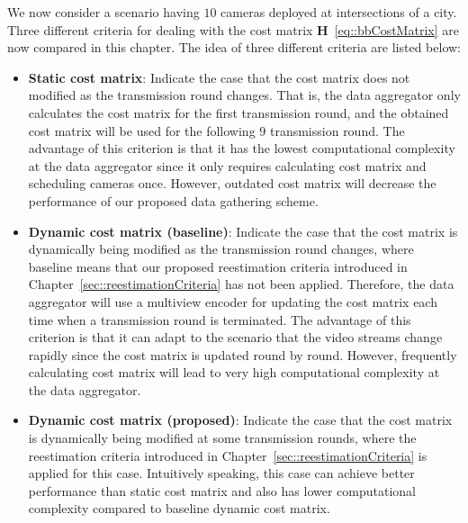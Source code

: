 {We now consider a scenario having $10$ cameras deployed at intersections of a city.
Three different criteria for dealing with the cost matrix $\mathbf{H}$~\eqref{eq::bbCostMatrix} are now compared in this chapter.
The idea of three different criteria are listed below:
\begin{itemize}
\item \textbf{Static cost matrix}: Indicate the case that the cost matrix does not modified as the transmission round changes.
That is, the data aggregator only calculates the cost matrix for the first transmission round, and the obtained cost matrix will be used for the following $9$ transmission round.
The advantage of this criterion is that it has the lowest computational complexity at the data aggregator since it only requires calculating cost matrix and scheduling cameras once.
However, outdated cost matrix will decrease the performance of our proposed data gathering scheme.
\item \textbf{Dynamic cost matrix (baseline)}: Indicate the case that the cost matrix is dynamically being modified as the transmission round changes, where baseline means that our proposed reestimation criteria introduced in Chapter~\ref{sec::reestimationCriteria} has not been applied.
Therefore, the data aggregator will use a multiview encoder for updating the cost matrix each time when a transmission round is terminated.
The advantage of this criterion is that it can adapt to the scenario that the video streams change rapidly since the cost matrix is updated round by round.
However, frequently calculating cost matrix will lead to very high computational complexity at the data aggregator.
\item \textbf{Dynamic cost matrix (proposed)}:
Indicate the case that the cost matrix is dynamically being modified at some transmission rounds, where the reestimation criteria introduced in Chapter~\ref{sec::reestimationCriteria} is applied for this case.
Intuitively speaking, this case can achieve better performance than static cost matrix and also has lower computational complexity compared to baseline dynamic cost matrix.
\end{itemize}

}
